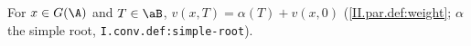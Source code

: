 For $x\in G(\A)$ and $T\in\aB$, $v(x,T)=\alpha(T)+v(x,0)$ (\cref{II.par.def:weight}; $\alpha$ the simple root, \texttt{I.conv.def:simple-root}).
